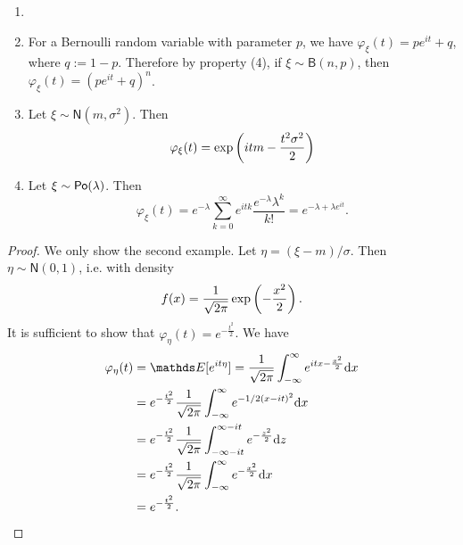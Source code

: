 \begin{example}
\begin{enumerate}
    \item[]
    \item For a Bernoulli random variable with parameter $p$, we have $\varphi_\xi (t) = pe^{it} + q$, where $q := 1-p$. Therefore by property (4), if $\xi \sim \mathsf{B}(n,p)$, then $\varphi_\xi (t) = (pe^{it} + q)^n$.
    \item Let $\xi \sim \mathsf{N}(m, \sigma^2)$. Then $$\varphi_\xi(t) = \exp\left( itm - \frac{t^2\sigma^2}{2} \right)$$
    \item Let $\xi \sim \mathsf{Po}(\lambda)$. Then 
    \begin{equation*}
        \varphi_\xi(t) = e^{-\lambda} \sum_{k=0}^\infty e^{i t k} \frac{e^{-\lambda}\lambda^k}{k!} = e^{-\lambda + \lambda e^{it}}.
    \end{equation*}
\end{enumerate}
\end{example}
\begin{proof}
We only show the second example. Let $\eta = (\xi - m)/\sigma$. Then $\eta \sim \mathsf{N}(0,1)$, i.e. with density 
    \begin{equation*}
        f(x) = \frac{1}{\sqrt{2\pi}} \exp\left( -\frac{x^2}{2} \right).
    \end{equation*}
    It is sufficient to show that $\varphi_\eta(t) = e^{-\frac{t^2}{2}}$. We have
    \begin{align*}
        \varphi_\eta (t) &= \E[e^{it\eta}] = \frac{1}{\sqrt{2\pi}} \int_{-\infty}^\infty e^{itx - \frac{x^2}{2}} \d x\\
        &= e ^{-\frac{t^2}{2}} \frac{1}{\sqrt{2\pi}} \int_{-\infty}^\infty e^{-1/2(x-it)^2} \d x\\
        &= e^{-\frac{t^2}{2}} \frac{1}{\sqrt{2\pi}} \int_{-\infty - it}^{\infty -it} e^{-\frac{z^2}{2}} \d z\\
        &= e^{-\frac{t^2}{2}} \frac{1}{\sqrt{2\pi}} \int_{-\infty}^\infty e^{-\frac{x^2}{2}} \d x\\
        &= e ^{-\frac{t^2}{2}}.
\end{align*}
\end{proof}

